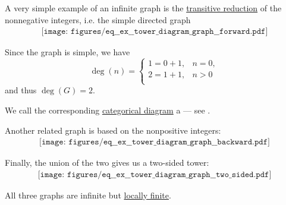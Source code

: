 \begin{example}\label{ex:tower_diagram_graph}
  A very simple example of an infinite graph is the \hyperref[def:relation_closures/transitive]{transitive reduction} of the nonnegative integers, i.e. the simple directed graph
  \begin{equation}\label{eq:ex:tower_diagram_graph/forward}
    \begin{aligned}
      \texttt{[image: figures/eq\_\_ex\_\_tower\_diagram\_graph\_\_forward.pdf]}
    \end{aligned}
  \end{equation}

  Since the graph is simple, we have
  \begin{equation*}
    \deg(n) = \begin{cases}
      1 = 0 + 1, &n = 0, \\
      2 = 1 + 1, &n > 0 \\
    \end{cases}
  \end{equation*}
  and thus \( \deg(G) = 2 \).

  We call the corresponding \hyperref[def:categorical_diagram]{categorical diagram} a  --- see .

  Another related graph is based on the nonpositive integers:
  \begin{equation}\label{eq:ex:tower_diagram_graph/backward}
    \begin{aligned}
      \texttt{[image: figures/eq\_\_ex\_\_tower\_diagram\_graph\_\_backward.pdf]}
    \end{aligned}
  \end{equation}

  Finally, the union of the two gives us a two-sided tower:
  \begin{equation}\label{eq:ex:tower_diagram_graph/two_sided}
    \begin{aligned}
      \texttt{[image: figures/eq\_\_ex\_\_tower\_diagram\_graph\_\_two\_sided.pdf]}
    \end{aligned}
  \end{equation}

  All three graphs are infinite but \hyperref[def:graph/degree]{locally finite}.
\end{example}

